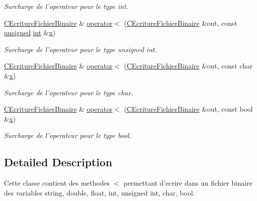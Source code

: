 \begin{DoxyCompactItemize}
\begin{DoxyCompactList}\small\item\em Surcharge de l'operateur pour le type {\itshape int}. \end{DoxyCompactList}\item 
\hyperlink{class_c_ecriture_fichier_binaire}{C\-Ecriture\-Fichier\-Binaire} \& \hyperlink{class_c_ecriture_fichier_binaire_a38d0f050dcc8a79522b0fb9b9c591f72}{operator$<$} (\hyperlink{class_c_ecriture_fichier_binaire}{C\-Ecriture\-Fichier\-Binaire} \&out, const \hyperlink{_free_image_8h_a425076c7067a1b5166e2cc530e914814}{unsigned} \hyperlink{wglew_8h_a500a82aecba06f4550f6849b8099ca21}{int} \&\hyperlink{glew_8h_ad77deca22f617d3f0e0eb786445689fc}{x})
\begin{DoxyCompactList}\small\item\em Surcharge de l'operateur pour le type {\itshape unsigned} {\itshape int}. \end{DoxyCompactList}\item 
\hyperlink{class_c_ecriture_fichier_binaire}{C\-Ecriture\-Fichier\-Binaire} \& \hyperlink{class_c_ecriture_fichier_binaire_a3cb25116e2558d967dfd21e812e47a3e}{operator$<$} (\hyperlink{class_c_ecriture_fichier_binaire}{C\-Ecriture\-Fichier\-Binaire} \&out, const char \&\hyperlink{glew_8h_ad77deca22f617d3f0e0eb786445689fc}{x})
\begin{DoxyCompactList}\small\item\em Surcharge de l'operateur pour le type {\itshape char}. \end{DoxyCompactList}\item 
\hyperlink{class_c_ecriture_fichier_binaire}{C\-Ecriture\-Fichier\-Binaire} \& \hyperlink{class_c_ecriture_fichier_binaire_a37080aca11f391be69941db70093f77d}{operator$<$} (\hyperlink{class_c_ecriture_fichier_binaire}{C\-Ecriture\-Fichier\-Binaire} \&out, const bool \&\hyperlink{glew_8h_ad77deca22f617d3f0e0eb786445689fc}{x})
\begin{DoxyCompactList}\small\item\em Surcharge de l'operateur pour le type {\itshape bool}. \end{DoxyCompactList}\end{DoxyCompactItemize}


\subsection{Detailed Description}
Cette classe contient des methodes $<$ permettant d'ecrire dans un fichier binaire des variables string, double, float, int, unsigned int, char, bool. 

